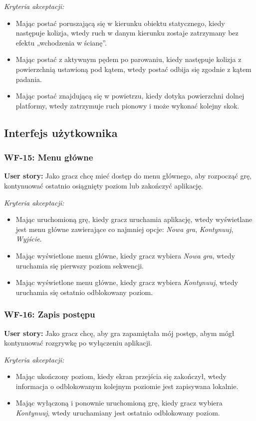 \textit{Kryteria akceptacji:}
\begin{itemize}[noitemsep]
    \item Mając postać poruszającą się w kierunku obiektu statycznego, kiedy następuje kolizja, wtedy ruch w danym kierunku zostaje zatrzymany bez efektu „wchodzenia w ścianę”.
    \item Mając postać z aktywnym pędem po parowaniu, kiedy następuje kolizja z powierzchnią ustawioną pod kątem, wtedy postać odbija się zgodnie z kątem padania.
    \item Mając postać znajdującą się w powietrzu, kiedy dotyka powierzchni dolnej platformy, wtedy zatrzymuje ruch pionowy i może wykonać kolejny skok.
\end{itemize}

\subsection{Interfejs użytkownika}

\subsubsection*{WF-15: Menu główne}
\textbf{User story:} Jako gracz chcę mieć dostęp do menu głównego, aby rozpocząć grę, kontynuować ostatnio osiągnięty poziom lub zakończyć aplikację.

\textit{Kryteria akceptacji:}
\begin{itemize}[noitemsep]
    \item Mając uruchomioną grę, kiedy gracz uruchamia aplikację, wtedy wyświetlane jest menu główne zawierające co najmniej opcje: \textit{Nowa gra}, \textit{Kontynuuj}, \textit{Wyjście}.
    \item Mając wyświetlone menu główne, kiedy gracz wybiera \textit{Nowa gra}, wtedy uruchamia się pierwszy poziom sekwencji.
    \item Mając wyświetlone menu główne, kiedy gracz wybiera \textit{Kontynuuj}, wtedy uruchamia się ostatnio odblokowany poziom.
\end{itemize}

\subsubsection*{WF-16: Zapis postępu}
\textbf{User story:} Jako gracz chcę, aby gra zapamiętała mój postęp, abym mógł kontynuować rozgrywkę po wyłączeniu aplikacji.

\textit{Kryteria akceptacji:}
\begin{itemize}[noitemsep]
    \item Mając ukończony poziom, kiedy ekran przejścia się zakończył, wtedy informacja o odblokowanym kolejnym poziomie jest zapisywana lokalnie.
    \item Mając wyłączoną i ponownie uruchomioną grę, kiedy gracz wybiera \textit{Kontynuuj}, wtedy uruchamiany jest ostatnio odblokowany poziom.
\end{itemize}

